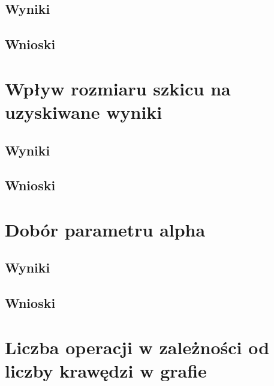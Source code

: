     \subsection{Wyniki}

    \subsection{Wnioski}

\section{Wpływ rozmiaru szkicu na uzyskiwane wyniki}

    \subsection{Wyniki}

    \subsection{Wnioski}

\section{Dobór parametru alpha}

    \subsection{Wyniki}

    \subsection{Wnioski}

\section{Liczba operacji w zależności od liczby krawędzi w grafie}
\label{sec:performance}